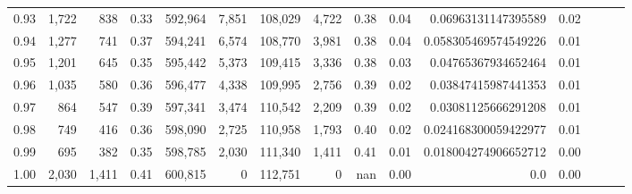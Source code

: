 \begin{tabular}{rrrrrrrrrrrrrrr}
0.93 &   1,722 &    838 &  0.33 &  592,964 &    7,851 &  108,029 &    4,722 &  0.38 &  0.04 &   0.06963131147395589 &      0.02 \\
0.94 &   1,277 &    741 &  0.37 &  594,241 &    6,574 &  108,770 &    3,981 &  0.38 &  0.04 &  0.058305469574549226 &      0.01 \\
0.95 &   1,201 &    645 &  0.35 &  595,442 &    5,373 &  109,415 &    3,336 &  0.38 &  0.03 &   0.04765367934652464 &      0.01 \\
0.96 &   1,035 &    580 &  0.36 &  596,477 &    4,338 &  109,995 &    2,756 &  0.39 &  0.02 &   0.03847415987441353 &      0.01 \\
0.97 &     864 &    547 &  0.39 &  597,341 &    3,474 &  110,542 &    2,209 &  0.39 &  0.02 &   0.03081125666291208 &      0.01 \\
0.98 &     749 &    416 &  0.36 &  598,090 &    2,725 &  110,958 &    1,793 &  0.40 &  0.02 &  0.024168300059422977 &      0.01 \\
0.99 &     695 &    382 &  0.35 &  598,785 &    2,030 &  111,340 &    1,411 &  0.41 &  0.01 &  0.018004274906652712 &      0.00 \\
1.00 &   2,030 &  1,411 &  0.41 &  600,815 &        0 &  112,751 &        0 &   nan &  0.00 &                   0.0 &      0.00 \\
\bottomrule
\end{tabular}
